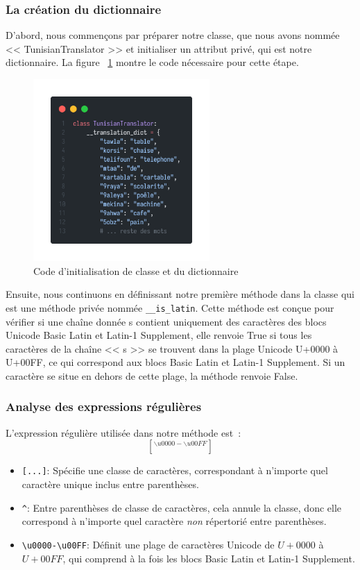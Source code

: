 \subsubsection{La création du dictionnaire}
\noindent
D'abord, nous commençons par préparer notre classe, que nous avons nommée << TunisianTranslator >> et initialiser un attribut privé, qui est notre dictionnaire. La figure ~\ref{fig:dictionary} montre le code nécessaire pour cette étape.

\begin{figure}[H]
	\centering
	\includegraphics[width=0.6\textwidth]{logos/dictionary.png}
	\caption{Code d'initialisation de classe et du dictionnaire}
	\label{fig:dictionary}
\end{figure}

\noindent
Ensuite, nous continuons en définissant notre première méthode dans la classe qui est une méthode privée nommée \texttt{\_\_is\_latin}. Cette méthode est conçue pour vérifier si une chaîne donnée s contient uniquement des caractères des blocs Unicode Basic Latin et Latin-1 Supplement, elle renvoie True si tous les caractères de la chaîne << s >> se trouvent dans la plage Unicode U+0000 à U+00FF, ce qui correspond aux blocs Basic Latin et Latin-1 Supplement. Si un caractère se situe en dehors de cette plage, la méthode renvoie False.

\subsubsection{Analyse des expressions régulières}
\noindent
L'expression régulière utilisée dans notre méthode est :
\Large\[ [^{\backslash u0000-\backslash u00FF}] \]
\begin{itemize}
    \item \texttt{[...]}: Spécifie une classe de caractères, correspondant à n'importe quel caractère unique inclus entre parenthèses.
    \item \texttt{\^{}}: Entre parenthèses de classe de caractères, cela annule la classe, donc elle correspond à n'importe quel caractère \emph{non} répertorié entre parenthèses.
    \item \texttt{\textbackslash u0000-\textbackslash u00FF}: Définit une plage de caractères Unicode de \( U+0000 \) à \( U+00FF \), qui comprend à la fois les blocs Basic Latin et Latin-1 Supplement.
\end{itemize}

